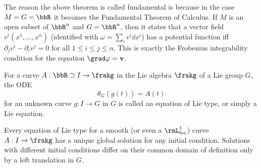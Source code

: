 \begin{rem}
    The reason the above theorem is called fundamental is because in the case $M=G=\bbR$ it becomes the Fundamental Theorem of Calculus. If $M$ is an open subset of $\bbR^n$ and $G=\bbR^n$, then it states that a vector field $v^i(x^1,\ldots,x^n)$ (identified with $\omega=\sum_iv^i\dd x^i$) has a potential function iff $\partial_j v^i-\partial_i v^j=0$ for all $1\leq i\leq j\leq n$. This is exactly the Frobenius integrability condition for the equation $\grad \varphi=\bf{v}$.
\end{rem}

\begin{defn}
    For a curve $A:\bbR\supset I\to \frakg$ in the Lie algebra $\frakg$ of a Lie group $G$, the ODE 
    \[\theta_G(\dot g(t))=A(t)\] 
    for an unknown curve $g:I\to G$ in $G$ is called an equation of Lie type, or simply a Lie equation.
\end{defn}

\begin{cor}
    Every equation of Lie type for a smooth (or even a $\rmL^1_{\mathrm{loc}}$) curve $A:I\to \frakg$ has a unique global solution for any initial condition. Solutions with different initial conditions differ on their common domain of definition only by a left translation in $G$.
\end{cor}

